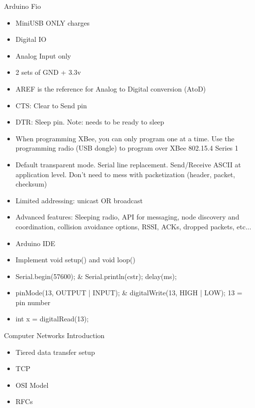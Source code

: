 \documentclass[11pt]{article}
\begin{document}
    Arduino Fio
    \begin{itemize}
        \item MiniUSB ONLY charges
        \item Digital IO
        \item Analog Input only
        \item 2 sets of GND + 3.3v
        \item AREF is the reference for Analog to Digital conversion (AtoD)
        \item CTS: Clear to Send pin
        \item DTR: Sleep pin. Note: needs to be ready to sleep

        \item When programming XBee, you can only program one at a time. Use the programming radio (USB dongle) to program over XBee 802.15.4 Series 1
        \item Default transparent mode. Serial line replacement. Send/Receive ASCII at application level. Don't need to mess with packetization (header, packet, checksum)
        \item Limited addressing: unicast OR broadcast
        \item Advanced features: Sleeping radio, API for messaging, node discovery and coordination, collision avoidance options, RSSI, ACKs, dropped packets, etc...

        \item Arduino IDE
        \item Implement void setup() and void loop()
        \item Serial.begin(57600); \& Serial.println(cstr); delay(ms);
        \item pinMode(13, OUTPUT | INPUT); \& digitalWrite(13, HIGH | LOW); 13 = pin number
        \item int x = digitalRead(13);
    \end{itemize}

    Computer Networks Introduction
    \begin{itemize}
        \item Tiered data transfer setup
        \item TCP
        \item OSI Model
        \item RFCs
    \end{itemize}
\end{document}
